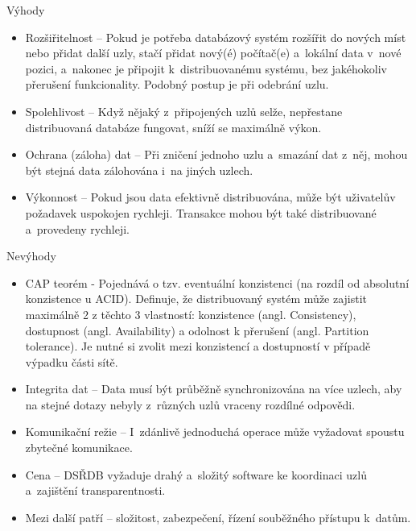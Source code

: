\noindent Výhody
\begin{itemize}
\item Rozšiřitelnost – Pokud je potřeba databázový systém rozšířit do nových míst nebo přidat další uzly, stačí přidat nový(é) počítač(e) a~lokální data v~nové pozici, a~nakonec je připojit k~distribuovanému systému, bez jakéhokoliv přerušení funkcionality. Podobný postup je při odebrání uzlu.

\item Spolehlivost – Když nějaký z~připojených uzlů selže, nepřestane distribuovaná databáze fungovat, sníží se maximálně výkon.

\item Ochrana (záloha) dat – Při zničení jednoho uzlu a~smazání dat z~něj, mohou být stejná data zálohována i~na jiných uzlech.

\item Výkonnost – Pokud jsou data efektivně distribuována, může být uživatelův požadavek uspokojen rychleji. Transakce mohou být také distribuované a~provedeny rychleji. 
\end{itemize}

\noindent Nevýhody
\begin{itemize}
\item CAP teorém - Pojednává o tzv. eventuální konzistenci (na rozdíl od absolutní konzistence u ACID). Definuje, že distribuovaný systém může zajistit maximálně 2 z těchto 3 vlastností: konzistence (angl. Consistency), dostupnost (angl. Availability) a odolnost k přerušení (angl. Partition tolerance). Je nutné si zvolit mezi konzistencí a dostupností v případě výpadku části sítě.

\item Integrita dat – Data musí být průběžně synchronizována na více uzlech, aby na stejné dotazy nebyly z~různých uzlů vraceny rozdílné odpovědi.

\item Komunikační režie – I~zdánlivě jednoduchá operace může vyžadovat spoustu zbytečné komunikace.

\item Cena – DSŘDB vyžaduje drahý a~složitý software ke koordinaci uzlů a~zajištění transparentnosti. \cite{distributedDBMS}

\item Mezi další patří – složitost, zabezpečení, řízení souběžného přístupu k~datům.
\end{itemize}

